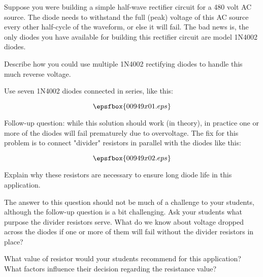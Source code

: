 

Suppose you were building a simple half-wave rectifier circuit for a 480 volt AC source.  The diode needs to withstand the full (peak) voltage of this AC source every other half-cycle of the waveform, or else it will fail.  The bad news is, the only diodes you have available for building this rectifier circuit are model 1N4002 diodes.

Describe how you could use multiple 1N4002 rectifying diodes to handle this much reverse voltage.







Use seven 1N4002 diodes connected in series, like this:

$$\epsfbox{00949x01.eps}$$

\vskip 10pt

Follow-up question: while this solution should work (in theory), in practice one or more of the diodes will fail prematurely due to overvoltage.  The fix for this problem is to connect "divider" resistors in parallel with the diodes like this:

$$\epsfbox{00949x02.eps}$$

Explain why these resistors are necessary to ensure long diode life in this application.







The answer to this question should not be much of a challenge to your students, although the follow-up question is a bit challenging.  Ask your students what purpose the divider resistors serve.  What do we know about voltage dropped across the diodes if one or more of them will fail without the divider resistors in place?

What value of resistor would your students recommend for this application?  What factors influence their decision regarding the resistance value?




